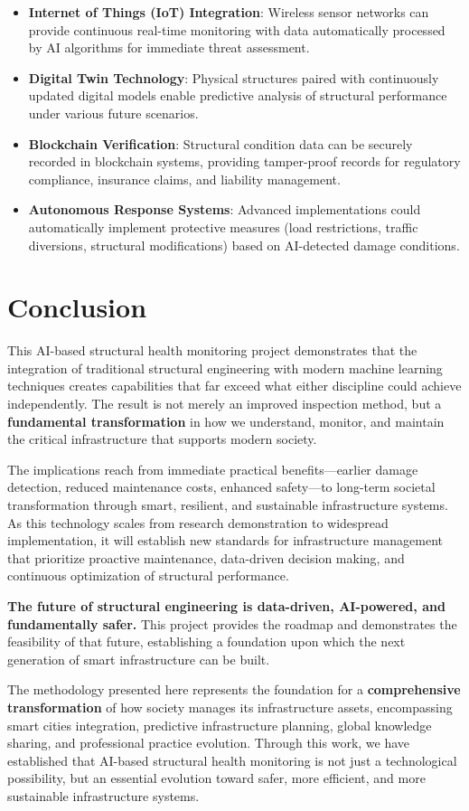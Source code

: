 \documentclass[11pt,a4paper]{article}
\begin{document}
\begin{itemize}
    \item \textbf{Internet of Things (IoT) Integration}: Wireless sensor networks can provide continuous real-time monitoring with data automatically processed by AI algorithms for immediate threat assessment.
    
    \item \textbf{Digital Twin Technology}: Physical structures paired with continuously updated digital models enable predictive analysis of structural performance under various future scenarios.
    
    \item \textbf{Blockchain Verification}: Structural condition data can be securely recorded in blockchain systems, providing tamper-proof records for regulatory compliance, insurance claims, and liability management.
    
    \item \textbf{Autonomous Response Systems}: Advanced implementations could automatically implement protective measures (load restrictions, traffic diversions, structural modifications) based on AI-detected damage conditions.
\end{itemize}

\section{Conclusion}

This AI-based structural health monitoring project demonstrates that the integration of traditional structural engineering with modern machine learning techniques creates capabilities that far exceed what either discipline could achieve independently. The result is not merely an improved inspection method, but a \textbf{fundamental transformation} in how we understand, monitor, and maintain the critical infrastructure that supports modern society.

The implications reach from immediate practical benefits—earlier damage detection, reduced maintenance costs, enhanced safety—to long-term societal transformation through smart, resilient, and sustainable infrastructure systems. As this technology scales from research demonstration to widespread implementation, it will establish new standards for infrastructure management that prioritize proactive maintenance, data-driven decision making, and continuous optimization of structural performance.

\textbf{The future of structural engineering is data-driven, AI-powered, and fundamentally safer.} This project provides the roadmap and demonstrates the feasibility of that future, establishing a foundation upon which the next generation of smart infrastructure can be built.

The methodology presented here represents the foundation for a \textbf{comprehensive transformation} of how society manages its infrastructure assets, encompassing smart cities integration, predictive infrastructure planning, global knowledge sharing, and professional practice evolution. Through this work, we have established that AI-based structural health monitoring is not just a technological possibility, but an essential evolution toward safer, more efficient, and more sustainable infrastructure systems.
\end{document}
